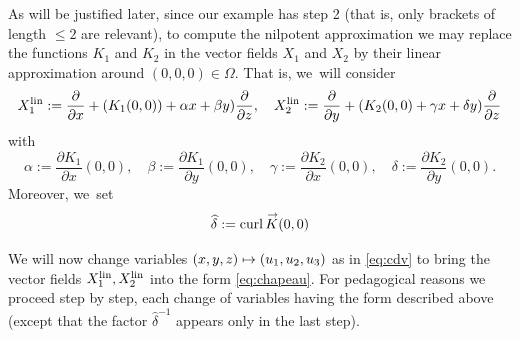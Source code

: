 \documentclass[10pt]{amsart}
\newcommand\mto{\mathchoice{\longmapsto}{\mapsto}{\mapsto}{\mapsto}}
\newcommand{\lin}{\textup{lin}}
\DeclareMathOperator{\curl}{curl}
\renewcommand{\vec}[1]
{\overset{\,{\raisebox{-2pt}{$\scriptstyle\to$}}}{#1}}
\theoremstyle{definition}
\newcommand{\1}{\mathbbm{1}}
\begin{document}
As will be justified later, since our example has step 2 (that is, only brackets of length $\leq 2$ are relevant), to compute the nilpotent approximation we may replace the functions $K_1$ and $K_2$ in the vector fields $X_1$ and $X_2$ by their linear approximation around $(0,0,0)\in\Omega$. That is, we~will consider
\[
X_1^\lin := \frac{\partial}{\partial x} + (K_1(0,0)) + \alpha x + \beta y) \frac{\partial}{\partial z},\quad
X_2^\lin := \frac{\partial}{\partial y} +(K_2 (0,0) + \gamma x + \delta y) \frac{\partial}{\partial z}
\]
with
\[
\alpha := \frac{\partial K_1}{\partial x} (0,0),
\quad
\beta := \frac{\partial K_1}{\partial y} (0,0),
\quad
\gamma := \frac{\partial K_2}{\partial x} (0,0),
\quad
\delta := \frac{\partial K_2}{\partial y} (0,0).
\]
Moreover, we~set
\[
\widehat \delta := \curl \vec K (0,0)
\]

We will now change variables $(x,y,z)\mto (u_1,u_2,u_3)$ as in \eqref{eq:cdv} to bring the vector fields $X_1^\lin, X_2^\lin$ into the form \eqref{eq:chapeau}. For pedagogical reasons we proceed step by step, each change of variables having the form described above (except that the factor $\widehat\delta^{-1}$ appears only in the last step).
\end{document}
